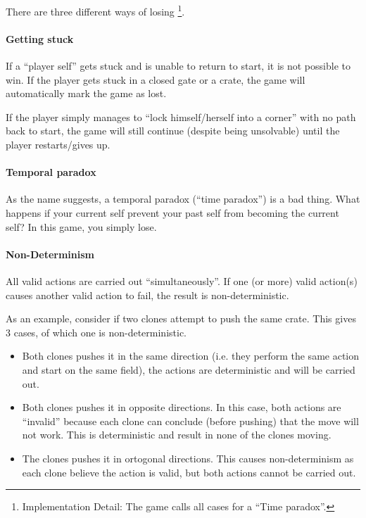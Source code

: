 There are three different ways of losing
\footnote{Implementation Detail: The game calls all cases for a ``Time paradox''.}.

\paragraph{Getting stuck}
If a ``player self'' gets stuck and is unable to return to start, it
is not possible to win.  If the player gets stuck in a closed gate or
a crate, the game will automatically mark the game as lost.

If the player simply manages to ``lock himself/herself into a corner''
with no path back to start, the game will still continue (despite being
unsolvable) until the player restarts/gives up.

\paragraph{Temporal paradox}
\label{temporal-paradox}
As the name suggests, a temporal paradox (``time paradox'') is a bad
thing.  What happens if your current self prevent your past self from
becoming the current self?  In this game, you simply lose.

\paragraph{Non-Determinism}
All valid actions are carried out ``simultaneously''.  If one (or
more) valid action(s) causes another valid action to fail, the result
is non-deterministic.

As an example, consider if two clones attempt to push the same
crate.  This gives 3 cases, of which one is non-deterministic.

\begin{itemize}
\item Both clones pushes it in the same direction (i.e. they perform
  the same action and start on the same field), the actions are
  deterministic and will be carried out.
\item Both clones pushes it in opposite directions.  In this case,
  both actions are ``invalid'' because each clone can conclude (before
  pushing) that the move will not work.  This is deterministic and
  result in none of the clones moving.
\item The clones pushes it in ortogonal directions.  This causes
  non-determinism as each clone believe the action is valid, but
  both actions cannot be carried out.
\end{itemize}

